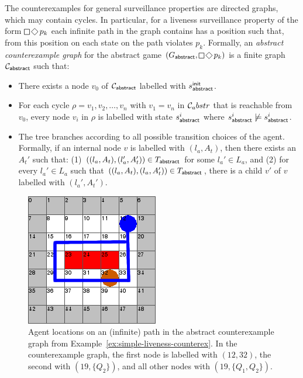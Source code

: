 The counterexamples for general surveillance properties are directed graphs, which may contain cycles. In particular, for a liveness surveillance property of the form $\LTLglobally\LTLfinally p_k$ each infinite path in the graph contains has a position such that, from this position on each state on the path violates $p_k$. Formally, an \emph{abstract counterexample graph} for the abstract game $(G_\abstr,\LTLglobally\LTLfinally p_k)$ is a finite graph $\mathcal{C}_{\mathsf{abstract}}$ such that:
\begin{itemize}
\item There exists a node $v_0$ of $\mathcal{C}_{\mathsf{abstract}}$ labelled with $s^{\mathsf{init}}_{\mathsf{abstract}}$.
\item For each cycle $\rho = v_1,v_2,\ldots,v_n$ with $v_1 = v_n$ in $\mathcal{C}_abstr$ that is reachable from $v_0$, every node $v_i$ in $\rho$ is labelled with state $s_{\mathsf{abstract}}^i$ where $s_{\mathsf{abstract}}^i \not\models s_{\mathsf{abstract}}^i$.
\item The tree branches according to all possible transition choices of the agent. Formally, if an internal node $v$ is labelled with $(l_a,A_t)$, then there exists an $A_t'$  such that: (1) $((l_a,A_t),(l_a',A_t')) \in T_{\mathsf{abstract}}$ for some $l_a' \in L_a$, and (2) for every $l_a' \in L_a$ such that $((l_a,A_t),(l_a,A_t')) \in T_{\mathsf{abstract}}$, there is a child $v'$ of $v$ labelled with $(l_a',A_t')$.
\end{itemize}   

\begin{figure}
\begin{center}
\includegraphics[scale=.33]{figs/7x7_liveness.png}
\end{center}
\caption{Agent locations on an (infinite) path in the abstract counterexample graph from Example~\ref{ex:simple-liveness-counterex}. In the counterexample graph, the first node is labelled with $(12,32)$, the second with $(19,\{Q_2\})$, and all other nodes with $(19,\{Q_1,Q_2\})$.}
\label{fig:simple-liveness-counterex}
\end{figure}

